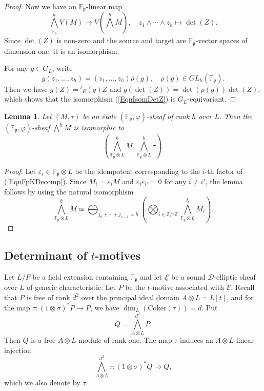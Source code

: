 \documentclass[10pt]{amsart}
\theoremstyle{plain}
\newtheorem{lem}[thm]{Lemma}
\theoremstyle{definition}
\newcommand{\Coker}{\mathrm{Coker}}
\newcommand{\ucE}{\underline{\mathcal{E}}}
\newcommand{\vep}{\varepsilon}
\newcommand{\bF}{\mathbb{F}}
\newcommand{\bZ}{\mathbb{Z}}
\newcommand{\sD}{\mathscr{D}}
\newcommand{\frp}{\mathfrak{p}}
\begin{document}
\begin{proof}
	Now we have an $\bF_\frp$-linear map
	\begin{equation}\label{EqnIsomDetZ}
		\bigwedge^h_{\bF_\frp} V(M)\to V(\bigwedge^h M),\quad z_1\wedge\cdots\wedge z_h\mapsto \det(Z).
	\end{equation}
	Since $\det(Z)$ is non-zero and the source and target are $\bF_\frp$-vector spaces of dimension one, it is an isomorphism. 
	
	For any $g\in G_L$, write
	\[
	g(z_1,\ldots,z_h)=(z_1,\ldots,z_h)\rho(g),\quad \rho(g)\in \mathit{GL}_h(\bF_\frp).
	\]
	Then we have $g(Z)={}^{t}\! \rho(g) Z$ and $g(\det(Z))=\det(\rho(g))\det(Z)$, which shows that the isomorphism (\ref{EqnIsomDetZ}) is $G_L$-equivariant.
\end{proof}



\begin{lem}\label{LemGenLafforgue}
	Let $(M,\tau)$ be an \'{e}tale $(\bF_\frp,\varphi)$-sheaf of rank $h$ over $L$.
	Then the $(\bF_\frp,\varphi)$-sheaf $\bigwedge^h M$ is isomorphic to
	\[
	(\bigwedge^h_{\bF_\frp\otimes L} M, \bigwedge^h_{\bF_\frp\otimes L}\tau).
	\]
\end{lem}
\begin{proof}
	Let $\vep_i\in \bF_\frp\otimes L$ be the idempotent corresponding to the $i$-th factor of (\ref{EqnFpKDecomp}). Since $M_i=\vep_i M$
	and $\vep_i\vep_{i'}=0$ for any $i\neq i'$, the lemma follows by using
	the natural isomorphism
	\[
	\bigwedge^h_{\bF_\frp\otimes L}M\simeq \bigoplus_{j_0+\cdots+j_{r-1}=h}\left(\bigotimes_{i\in \bZ/r\bZ}\bigwedge^{j_i}_{\bF_\frp\otimes L} M_i\right).
	\]
\end{proof}

\subsection{Determinant of $t$-motives}\label{SubsecDetTMot}

Let $L/F$ be a field extension containing $\bF_\frp$ and let $\ucE$ be a sound $\sD$-elliptic sheaf over $L$ of generic characteristic.
Let $P$ be the $t$-motive associated with $\ucE$.
Recall that $P$ is free of rank $d^2$ over the principal ideal domain $A\otimes L=L[t]$,
and for the map $\tau:(1\otimes \sigma)^*P\to P$, we have $\dim_L(\Coker(\tau))=d$. 
Put
\[
Q=\bigwedge^{d^2}_{A\otimes L}P.
\]
Then $Q$ is a free $A\otimes L$-module of rank one. 
The map $\tau$ induces an $A\otimes L$-linear injection
\[
\bigwedge^{d^2}_{A\otimes L}\tau:(1\otimes \sigma)^*Q\to Q,
\]
which we also denote by $\tau$.
\end{document}
